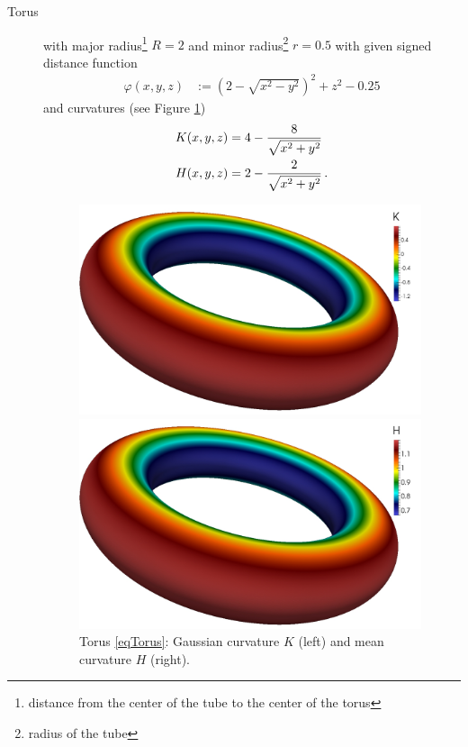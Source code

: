 \begin{description}
      \item[Torus] with major radius\footnote{distance from the center of the tube to the center of the torus} \( R = 2 \)
                   and minor radius\footnote{radius of the tube} \mbox{\( r=0.5 \)}
                   with given signed distance function  
              \begin{align}
                \label{eqTorus}
                \varphi\left( x,y,z \right) &:= \left( 2 - \sqrt{x^{2}-y^{2}} \right)^{2} + z^{2} - 0.25 
              \end{align}
                  and curvatures (see Figure \ref{figTorus})
              \begin{align}
                K(x,y,z) &= 4 - \frac{8}{\sqrt{x^{2}+y^{2}}} \\
                H(x,y,z) &= 2 - \frac{2}{\sqrt{x^{2}+y^{2}}} \,\text{.}
              \end{align}
  \begin{figure}
    \begin{minipage}[htp]{.23\textwidth}
      \centering
      \includegraphics[width=0.99\textwidth]{bilder/torus/K.jpg}
    \end{minipage}\hfill
    \begin{minipage}[htp]{.23\textwidth}
      \centering
      \includegraphics[width=0.99\textwidth]{bilder/torus/H.jpg}
    \end{minipage}
    \caption{Torus \eqref{eqTorus}: Gaussian curvature \( K \) (left) and mean curvature \( H \) (right).}
    \label{figTorus}
  \end{figure}
    \end{description}

